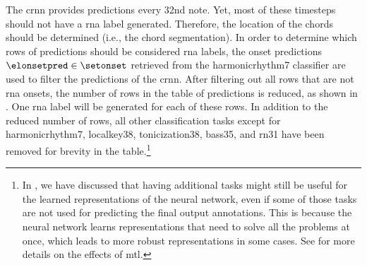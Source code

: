 
The \gls{crnn} provides predictions every \gls{32nd} note.
Yet, most of these timesteps should not have a \gls{rna}
label generated. Therefore, the location of the chords
should be determined (i.e., the chord segmentation). In
order to determine which rows of predictions should be
considered \gls{rna} labels, the onset predictions
$\elonsetpred \in \setonset$ retrieved from the
\gls{harmonicrhythm7} classifier are used to filter the
predictions of the \gls{crnn}. After filtering out all rows
that are not \gls{rna} onsets, the number of rows in the
table of predictions is reduced, as shown in
. One \gls{rna} label
will be generated for each of these rows. In addition to the
reduced number of rows, all other classification tasks
except for \gls{harmonicrhythm7}, \gls{localkey38},
\gls{tonicization38}, \gls{bass35}, and \gls{rn31} have been
removed for brevity in the table.\footnote{In
\textcite{napoleslopez2021augmentednet}, we have discussed
that having additional tasks might still be useful for the
learned representations of the neural network, even if some
of those tasks are not used for predicting the final output
annotations. This is because the neural network learns
representations that need to solve all the problems at once,
which leads to more robust representations in some cases.
See \textcite{ruder2017overview} for more details on the
effects of \gls{mtl}.}

